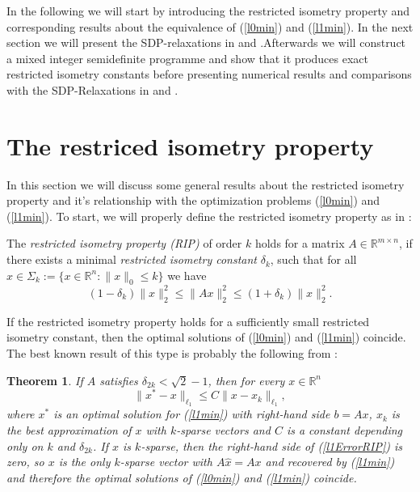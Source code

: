 \documentclass{elsarticle}
\newtheorem{thm}{Theorem}
\newcommand{\R}{\mathds{R}}
\begin{document}
In the following we will start by introducing the restricted isometry property and corresponding results about the equivalence of (\ref{l0min}) and (\ref{l1min}). In the next section we will present the SDP-relaxations in \cite{Asp07} 
and \cite{Asp08}.Afterwards we will construct a mixed integer semidefinite programme and show that it produces exact restricted isometry constants before presenting numerical results and comparisons with the SDP-Relaxations in 
\cite{Asp07} and \cite{Asp08}.

\section{The restriced isometry property}

In this section we will discuss some general results about the restricted isometry property and it's relationship with the optimization problems (\ref{l0min}) and (\ref{l1min}). To start, we will properly define the restricted
isometry property as in \cite{CT05}:

\begin{rmk} \label{ripdef}
The \emph{restricted isometry property (RIP)} of order $k$ holds for a matrix $A \in \R^{m \times n}$, if there exists a minimal \emph{restricted isometry constant} $\delta_k$, such that for all $x \in \Sigma_k := 
\{x \in \R^n : \|x\|_0 \leq k \}$ we have
 \begin{equation}\label{rip}
  (1-\delta_k)\|x\|_2^2 \leq \|Ax\|_2^2 \leq (1+\delta_k)\|x\|_2^2.
 \end{equation}
 \end{rmk}
 
 If the restricted isometry property holds for a sufficiently small restricted isometry constant, then the optimal solutions of (\ref{l0min}) and (\ref{l1min}) coincide. The best known result of this type is probably the following from
 \cite{Can08}:
 
\begin{thm} \label{RIPsqrt2}
 If $A$ satisfies $\delta_{2k} < \sqrt{2}-1$, then for every $x \in \R^n$
 \begin{equation*}\label{l1ErrorRIP}
  \|x^* - x \|_{\ell_1} \leq C \|x - x_k \|_{\ell_1},
 \end{equation*}
where $x^*$ is an optimal solution for (\ref{l1min}) with right-hand side $b = Ax$, $x_k$ is the best approximation of $x$ with $k$-sparse vectors and $C$ is a constant depending only on $k$ and $\delta_{2k}$. If $x$ is $k$-sparse, then the right-hand side of
(\ref{l1ErrorRIP}) is zero, so $x$ is the only $k$-sparse vector with $A\hat{x} = Ax$ and recovered by (\ref{l1min}) and therefore the optimal solutions of (\ref{l0min}) and (\ref{l1min}) coincide.\end{thm}
\end{document}
